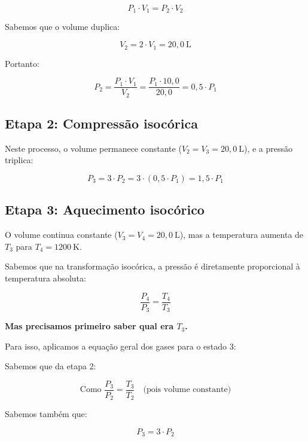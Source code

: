 \documentclass[a4paper,12pt]{article}
\begin{document}
\begin{flushleft}
\begin{equation}
P_1 \cdot V_1 = P_2 \cdot V_2
\end{equation}

Sabemos que o volume duplica:

\begin{equation}
V_2 = 2 \cdot V_1 = 20,0 \ \text{L}
\end{equation}

Portanto:

\begin{equation}
P_2 = \frac{P_1 \cdot V_1}{V_2} = \frac{P_1 \cdot 10,0}{20,0} = 0,5 \cdot P_1
\end{equation}

\subsection*{Etapa 2: Compressão isocórica}

Neste processo, o volume permanece constante ($V_2 = V_3 = 20,0 \ \text{L}$), e a pressão triplica:

\begin{equation}
P_3 = 3 \cdot P_2 = 3 \cdot (0,5 \cdot P_1) = 1,5 \cdot P_1
\end{equation}

\subsection*{Etapa 3: Aquecimento isocórico}

O volume continua constante ($V_3 = V_4 = 20,0 \ \text{L}$), mas a temperatura aumenta de $T_3$ para $T_4 = 1200 \ \text{K}$.

Sabemos que na transformação isocórica, a pressão é diretamente proporcional à temperatura absoluta:

\begin{equation}
\frac{P_4}{P_3} = \frac{T_4}{T_3}
\end{equation}

\textbf{Mas precisamos primeiro saber qual era $T_3$.}

Para isso, aplicamos a equação geral dos gases para o estado 3:

Sabemos que da etapa 2:

\[
\text{Como } \frac{P_3}{P_2} = \frac{T_3}{T_2} \quad \text{(pois volume constante)}
\]

Sabemos também que:

\begin{equation}
P_3 = 3 \cdot P_2
\end{equation}


\end{flushleft}
\end{document}
